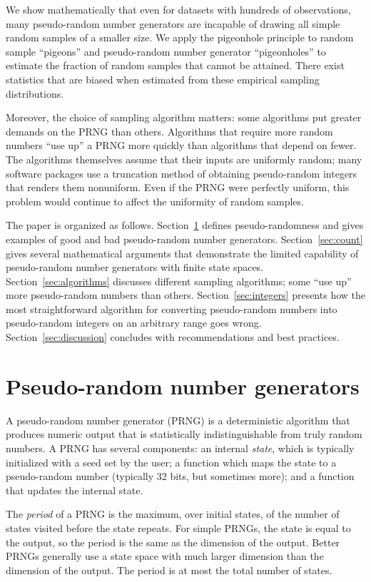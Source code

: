 \documentclass[graybox]{svmult}
\begin{document}
We show mathematically that even for datasets with hundreds of observations, many pseudo-random number generators
are incapable of drawing all simple random samples of a smaller size.
We apply the pigeonhole principle to random sample ``pigeons'' and pseudo-random number generator ``pigeonholes''
to estimate the fraction of random samples that cannot be attained.
There exist statistics that are biased when estimated from these empirical sampling distributions.

Moreover, the choice of sampling algorithm matters:
some algorithms put greater demands on the PRNG than others.
Algorithms that require more random numbers ``use up'' a PRNG more quickly than algorithms that depend on fewer.
The algorithms themselves assume that their inputs are uniformly random;
many software packages use a truncation method of obtaining pseudo-random integers that renders them nonuniform.
Even if the PRNG were perfectly uniform, this problem would continue to affect the uniformity of random samples.

The paper is organized as follows.
Section~\ref{sec:prngs} defines pseudo-randomness and gives examples of good and bad pseudo-random number generators.
Section~\ref{sec:count} gives several mathematical arguments that demonstrate the limited capability of pseudo-random number
generators with finite state spaces.
Section~\ref{sec:algorithms} discusses different sampling algorithms; some ``use up'' more pseudo-random numbers than others.
Section~\ref{sec:integers} presents how the most straightforward algorithm for converting pseudo-random numbers into pseudo-random integers on an arbitrary
range goes wrong.
Section~\ref{sec:discussion} concludes with recommendations and best practices.



\section{Pseudo-random number generators}
\label{sec:prngs}

A pseudo-random number generator (PRNG) is a deterministic algorithm that produces numeric output that is statistically indistinguishable
from truly random numbers.
A PRNG has several components:
an internal \emph{state}, which is typically initialized with a seed set by the user;
a function which maps the state to a pseudo-random number (typically 32 bits, but sometimes more);
and a function that updates the internal state.


The \emph{period} of a PRNG is the maximum, over initial states, of the number of states visited before the state repeats.
For simple PRNGs, the state is equal to the output, so the period is the same as the dimension of the output.
Better PRNGs generally use a state space with much larger dimension than the dimension of the output.
The period is at most the total number of states.
\end{document}
